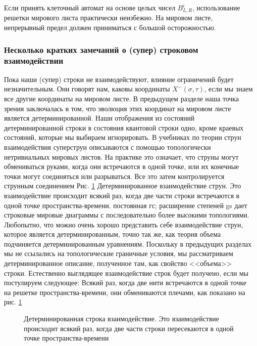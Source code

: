 \documentclass[main.tex]{subfiles}
\begin{document}
Если принять клеточный автомат на основе целых чисел $B_{L, R}^{i}$, использование решетки мирового листа практически неизбежно. На мировом листе, непрерывный предел должен приниматься с большой осторожностью.


\subsubsection{Несколько кратких замечаний о (супер) строковом взаимодействии}\label{ch17.3.6}

Пока наши (супер) строки не взаимодействуют, влияние ограничений будет незначительным. Они говорят нам, каковы координаты $X^-(\sigma,\tau)$, если мы знаем все другие координаты на мировом листе. В предыдущем разделе наша точка зрения заключалась в том, что эволюция этих координат на мировом листе является детерминированной. Наши отображения из состояний детерминированной строки в состояния квантовой строки одно, кроме краевых состояний, которые мы выбираем игнорировать. В учебниках по теории струн взаимодействия суперструн описываются с помощью топологически нетривиальных мировых листов. На практике это означает, что струны могут обмениваться руками, когда они встречаются в одной точке, или их конечные точки могут соединяться или разрываться. Все это затем контролируется струнным соединением
Рис. \ref{i17.2} Детерминированное взаимодействие струн. Это взаимодействие происходит всякий раз, когда две части строки встречаются в одной точке пространства-времени.
постоянная гс; расширение степеней gs дает строковые мировые диаграммы с последовательно более высокими топологиями.
Любопытно, что можно очень хорошо представить себе взаимодействие струн, которое является детерминированным, точно так же, как теория объема подчиняется детерминированным уравнениям. Поскольку в предыдущих разделах мы не ссылались на топологические граничные условия, мы рассматриваем детерминированное описание, полученное там, как свойство <<объема>> строки.
Естественно выглядящее взаимодействие строк будет получено, если мы постулируем следующее:
Всякий раз, когда две нити встречаются в одной точке на решетке пространства-времени, они обмениваются плечами, как показано на рис. \ref{i17.2}

\begin{figure}[ht]
	\begin{center}
		\caption{
		\label{i17.2} Детерминированная строка взаимодействие. Это взаимодействие происходит всякий раз, когда две части строки пересекаются в одной точке пространства-времени}
	\end {center}
\end {figure}
\end{document}
